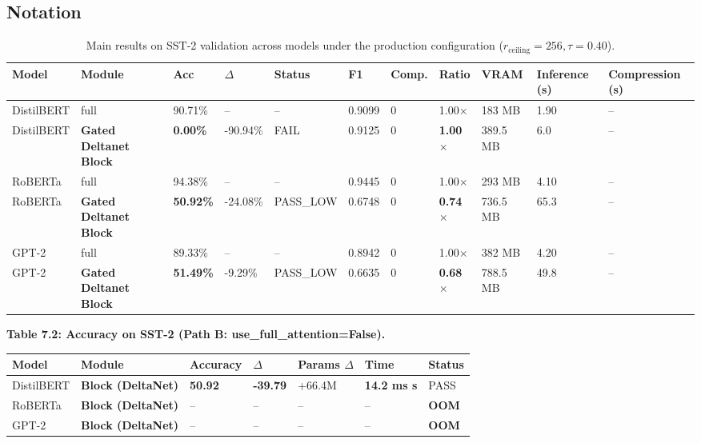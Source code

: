 \subsection{Notation}

\begin{table}[t]
\centering
\small
\begin{tabular}{lllllllllll}
\toprule
\textbf{Model} & \textbf{Module} & \textbf{Acc} & \textbf{$\Delta$} & \textbf{Status} & \textbf{F1} & \textbf{Comp.} & \textbf{Ratio} & \textbf{VRAM} & \textbf{Inference (s)} & \textbf{Compression (s)} \\
\midrule
DistilBERT & full & 90.71\% & -- & -- & 0.9099 & 0 & 1.00$\times$ & 183 MB & 1.90 & -- \\
DistilBERT & \textbf{Gated Deltanet Block} & \textbf{0.00\%} & -90.94\% & FAIL & 0.9125 & 0 & \textbf{1.00$\times$} & 389.5 MB & 6.0 & -- \\
RoBERTa & full & 94.38\% & -- & -- & 0.9445 & 0 & 1.00$\times$ & 293 MB & 4.10 & -- \\
RoBERTa & \textbf{Gated Deltanet Block} & \textbf{50.92\%} & -24.08\% & PASS_LOW & 0.6748 & 0 & \textbf{0.74$\times$} & 736.5 MB & 65.3 & -- \\
GPT-2 & full & 89.33\% & -- & -- & 0.8942 & 0 & 1.00$\times$ & 382 MB & 4.20 & -- \\
GPT-2 & \textbf{Gated Deltanet Block} & \textbf{51.49\%} & -9.29\% & PASS_LOW & 0.6635 & 0 & \textbf{0.68$\times$} & 788.5 MB & 49.8 & -- \\
\bottomrule
\end{tabular}
\caption{Main results on SST-2 validation across models under the production configuration ($r_{\mathrm{ceiling}}=256, \tau=0.40$).}
\label{tab:main_sst2}
\end{table}

\textbf{Table 7.2: Accuracy on SST-2 (Path B: use\_full\_attention=False).}

\begin{table}[H]
\centering
\small
\begin{tabular}{lllllll}
\toprule
\textbf{Model} & \textbf{Module} & \textbf{Accuracy} & \textbf{$\Delta$} & \textbf{Params $\Delta$} & \textbf{Time} & \textbf{Status} \\
\midrule
DistilBERT & \textbf{Block (DeltaNet)} & \textbf{50.92} & \textbf{-39.79} & +66.4M & \textbf{14.2 ms s} & PASS \\
RoBERTa & \textbf{Block (DeltaNet)} & -- & -- & -- & -- & \textbf{OOM} \\
GPT-2 & \textbf{Block (DeltaNet)} & -- & -- & -- & -- & \textbf{OOM} \\
\bottomrule
\end{tabular}
\end{table}


